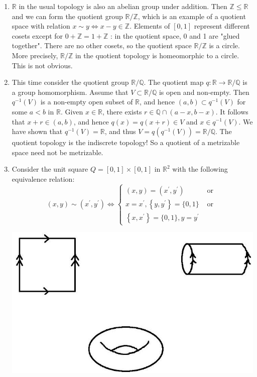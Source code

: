 \documentclass[a4paper,11pt]{article}
\begin{document}
\begin{example}
\begin{enumerate}
  \item $\mathbb{R}$ in the usual topology is also an abelian group under addition. Then $\mathbb{Z} \leqslant \mathbb{R}$ and we can form the quotient group $\mathbb{R} / \mathbb{Z}$, which is an example of a quotient space with relation $x \sim y \Longleftrightarrow x-y \in \mathbb{Z}$. Elements of $[0,1]$ represent different cosets except for $0+\mathbb{Z}=1+\mathbb{Z}$ : in the quotient space, 0 and 1 are "glued together". There are no other cosets, so the quotient space $\mathbb{R} / \mathbb{Z}$ is a circle. More precisely, $\mathbb{R} / \mathbb{Z}$ in the quotient topology is homeomorphic to a circle. This is not obvious.

  \item This time consider the quotient group $\mathbb{R} / \mathbb{Q}$. The quotient map $q: \mathbb{R} \rightarrow \mathbb{R} / \mathbb{Q}$ is a group homomorphism. Assume that $V \subset \mathbb{R} / \mathbb{Q}$ is open and non-empty. Then $q^{-1}(V)$ is a non-empty open subset of $\mathbb{R}$, and hence $(a, b) \subset q^{-1}(V)$ for some $a<b$ in $\mathbb{R}$. Given $x \in \mathbb{R}$, there exists $r \in \mathbb{Q} \cap(a-x, b-x)$. It follows that $x+r \in(a, b)$, and hence $q(x)=q(x+r) \in V$ and $x \in q^{-1}(V)$. We have shown that $q^{-1}(V)=\mathbb{R}$, and thus $V=q\left(q^{-1}(V)\right)=\mathbb{R} / \mathbb{Q}$. The quotient topology is the indiscrete topology! So a quotient of a metrizable space need not be metrizable.
\item Consider the unit square $Q=[0,1] \times[0,1]$ in $\mathbb{R}^{2}$ with the following equivalence relation:
$$
(x, y) \sim\left(x^{\prime}, y^{\prime}\right) \Longleftrightarrow \begin{cases}(x, y)=\left(x^{\prime}, y^{\prime}\right) & \text { or } \\ x=x^{\prime},\left\{y, y^{\prime}\right\}=\{0,1\} & \text { or } \\ \left\{x, x^{\prime}\right\}=\{0,1\}, y=y^{\prime} & \end{cases}
$$
\begin{center}
    \includegraphics[scale=0.4]{at4.jpg}

\end{center}
\end{enumerate}
\end{example}
\end{document}
